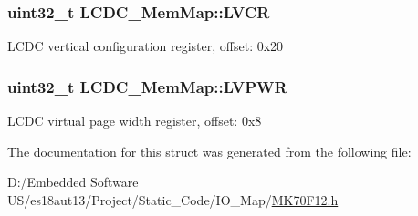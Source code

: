 \subsubsection[{L\+V\+C\+R}]{\setlength{\rightskip}{0pt plus 5cm}uint32\+\_\+t L\+C\+D\+C\+\_\+\+Mem\+Map\+::\+L\+V\+C\+R}\label{struct_l_c_d_c___mem_map_a865c74a990435ca94ba226f23894d8e7}
L\+C\+D\+C vertical configuration register, offset\+: 0x20 \hypertarget{struct_l_c_d_c___mem_map_aa687c8b47cdcef18890cac689de49a17}{}
\subsubsection[{L\+V\+P\+W\+R}]{\setlength{\rightskip}{0pt plus 5cm}uint32\+\_\+t L\+C\+D\+C\+\_\+\+Mem\+Map\+::\+L\+V\+P\+W\+R}\label{struct_l_c_d_c___mem_map_aa687c8b47cdcef18890cac689de49a17}
L\+C\+D\+C virtual page width register, offset\+: 0x8 

The documentation for this struct was generated from the following file\+:\begin{DoxyCompactItemize}
\item 
D\+:/\+Embedded Software U\+S/es18aut13/\+Project/\+Static\+\_\+\+Code/\+I\+O\+\_\+\+Map/\hyperlink{_m_k70_f12_8h}{M\+K70\+F12.\+h}\end{DoxyCompactItemize}
